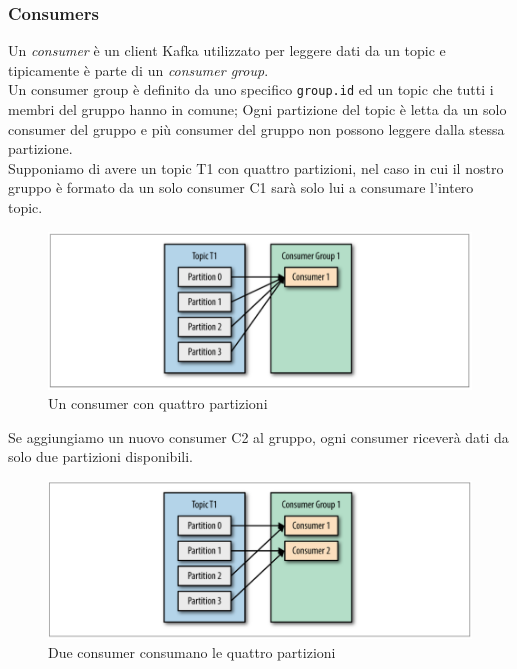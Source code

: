 \documentclass[]{article}
\begin{document}
\newpage

\subsubsection{Consumers}\label{consumers}

Un \emph{consumer} è un client Kafka utilizzato per leggere dati da un
topic e tipicamente è parte di un \emph{consumer group}.\\
Un consumer group è definito da uno specifico \texttt{group.id} ed un
topic che tutti i membri del gruppo hanno in comune; Ogni partizione del
topic è letta da un solo consumer del gruppo e più consumer del gruppo
non possono leggere dalla stessa partizione.\\
Supponiamo di avere un topic T1 con quattro partizioni, nel caso in cui
il nostro gruppo è formato da un solo consumer C1 sarà solo lui a
consumare l'intero topic.

\begin{figure}
\centering
\includegraphics[width=1.00000\textwidth]{../images/single-consumer.png}
\caption{Un consumer con quattro partizioni \label{figure_3}}
\end{figure}

Se aggiungiamo un nuovo consumer C2 al gruppo, ogni consumer riceverà
dati da solo due partizioni disponibili.

\begin{figure}
\centering
\includegraphics[width=1.00000\textwidth]{../images/two-consumers.png}
\caption{Due consumer consumano le quattro partizioni \label{figure_3}}
\end{figure}
\end{document}
